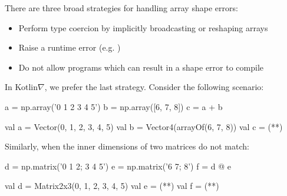 \documentclass[portrait,a0b,final,a4resizeable]{a0poster}
\begin{document}
\begin{poster}
\begin{multicols}{2}
\begin{minipage}[c]{0.85\columnwidth}
      There are three broad strategies for handling array shape errors:
      \begin{itemize}[leftmargin=1in]
        \item Perform type coercion by implicitly broadcasting or reshaping arrays
        \item Raise a runtime error (e.g. )
        \item Do not allow programs which can result in a shape error to compile
      \end{itemize}

      In Kotlin$\nabla$, we prefer the last strategy. Consider the following scenario:
      \end{minipage}

\null\hspace*{2cm}\begin{minipage}[c]{0.40\columnwidth}
\begin{pythonlisting}
a = np.array('0 1 2 3 4 5')
b = np.array([6, 7, 8])
c = a + b
\end{pythonlisting}
\end{minipage}
\null\hspace*{2cm}\begin{minipage}[c]{0.45\columnwidth}
\begin{kotlinlisting}
val a = Vector(0, 1, 2, 3, 4, 5)
val b = Vector4(arrayOf(6, 7, 8))
val c = (**)
\end{kotlinlisting}
\end{minipage}

\null\hspace*{3cm}\begin{minipage}[c]{0.85\columnwidth}
Similarly, when the inner dimensions of two matrices do not match:
\end{minipage}

\vspace*{-1cm}
\null\hspace*{2cm}\begin{minipage}[c]{0.40\columnwidth}
\begin{pythonlisting}
d = np.matrix('0 1 2; 3 4 5')
e = np.matrix('6 7; 8')
f = d @ e
                          \end{pythonlisting}
      \end{minipage}
      \null\hspace*{2cm}\begin{minipage}[c]{0.42\columnwidth}
                          \begin{kotlinlisting}
val d = Matrix2x3(0, 1, 2, 3, 4, 5)
val e = (**)
val f = (**)
                          \end{kotlinlisting}
      \end{minipage}


\end{multicols}
\end{poster}
\end{document}
